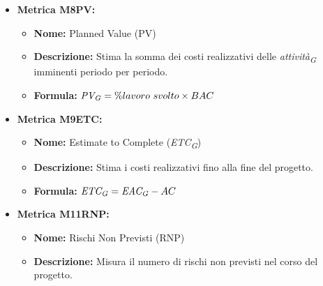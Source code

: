 \begin{itemize}
    \item \hypertarget{item:M8PV}{\textbf{Metrica M8PV:}}
    \begin{minipage}[t]{0.9\textwidth}
          \begin{itemize}
              \item \textbf{Nome:} Planned Value (PV)
              \item \textbf{Descrizione:} Stima la somma dei costi realizzativi delle \textit{attività}\textsubscript{\textit{G}} imminenti periodo per periodo.
              \item \textbf{Formula:} $\textit{PV}\textsubscript{\textit{G}} = \% lavoro \ svolto \times BAC$
          \end{itemize}
        \end{minipage}

    \item \hypertarget{item:M9ETC}{\textbf{Metrica M9ETC:}}
    \begin{minipage}[t]{0.9\textwidth}
          \begin{itemize}
              \item \textbf{Nome:} Estimate to Complete (\textit{ETC}\textsubscript{\textit{G}})
              \item \textbf{Descrizione:} Stima i costi realizzativi fino alla fine del progetto.
              \item \textbf{Formula:} $\textit{ETC}\textsubscript{\textit{G}} =\textit{EAC}\textsubscript{\textit{G}} - AC$
          \end{itemize}
        \end{minipage}

    \item \hypertarget{item:M11RNP}{\textbf{Metrica M11RNP:}}
    \begin{minipage}[t]{0.9\textwidth}
          \begin{itemize}
              \item \textbf{Nome:} Rischi Non Previsti (RNP)
              \item \textbf{Descrizione:} Misura il numero di rischi non previsti nel corso del progetto.
          \end{itemize}
        \end{minipage}


\end{itemize}
